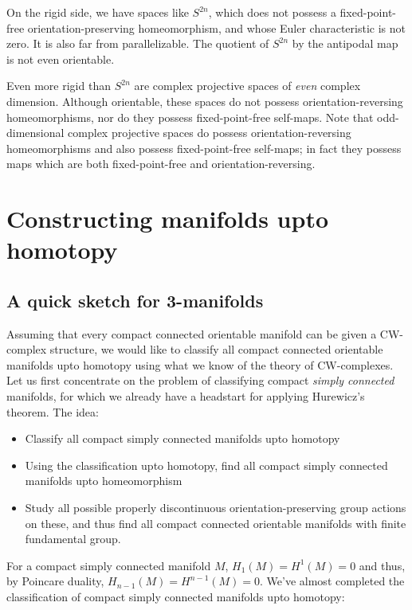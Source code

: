 \documentclass[a4paper]{amsart}
\begin{document}
On the rigid side, we have spaces like $S^{2n}$, which does not
possess a fixed-point-free orientation-preserving homeomorphism, and
whose Euler characteristic is not zero. It is also far from
parallelizable. The quotient of $S^{2n}$ by the antipodal map is not
even orientable.

Even more rigid than $S^{2n}$ are complex projective spaces of {\em
  even} complex dimension. Although orientable, these spaces do not
possess orientation-reversing homeomorphisms, nor do they possess
fixed-point-free self-maps. Note that odd-dimensional complex
projective spaces do possess orientation-reversing homeomorphisms and
also possess fixed-point-free self-maps; in fact they possess maps
which are both fixed-point-free and orientation-reversing.

\section{Constructing manifolds upto homotopy}

\subsection{A quick sketch for 3-manifolds}

Assuming that every compact connected orientable manifold can be given
a CW-complex structure, we would like to classify all compact
connected orientable manifolds upto homotopy using what we know of the
theory of CW-complexes. Let us first concentrate on the problem of
classifying compact {\em simply connected} manifolds, for which we
already have a headstart for applying Hurewicz's theorem. The idea:

\begin{itemize}

\item Classify all compact simply connected manifolds upto homotopy

\item Using the classification upto homotopy, find all compact simply
  connected manifolds upto homeomorphism

\item Study all possible properly discontinuous orientation-preserving
  group actions on these, and thus find all compact connected
  orientable manifolds with finite fundamental group.

\end{itemize}

For a compact simply connected manifold $M$, $H_1(M) = H^1(M) = 0$ and
thus, by Poincare duality, $H_{n-1}(M) = H^{n-1}(M) = 0$. We've almost
completed the classification of compact simply connected manifolds
upto homotopy:
\end{document}
